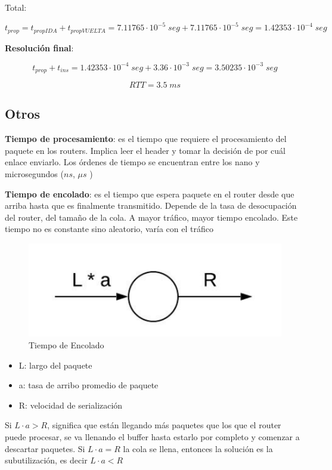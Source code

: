 \documentclass[titlepage,a4paper]{article}
\begin{document}
Total:

$$t_{prop} = t_{propIDA} + t_{propVUELTA}  =  7.11765 \cdot 10^{-5} \; seg + 7.11765 \cdot 10^{-5} \; seg = 1.42353\cdot10^{-4} \; seg$$

\textbf{Resolución final}:

$$ t_{prop} + t_{ins} = 1.42353\cdot10^{-4} \; seg + 3.36 \cdot 10^{-3} \; seg = 3.50235 \cdot 10^{-3} \; seg$$

$$ RTT = 3.5 \; ms$$


\subsection{Otros}

\textbf{Tiempo de procesamiento}: es el tiempo que requiere el procesamiento del paquete en los routers. Implica leer el header y tomar la decisión de por cuál enlace enviarlo. Los órdenes de tiempo se encuentran entre los nano y microsegundos ($ns$, $\mu s$ )

\textbf{Tiempo de encolado}: es el tiempo que espera paquete en el router desde que arriba hasta que es finalmente transmitido. Depende de la tasa de desocupación del router, del tamaño de la cola. A mayor tráfico, mayor tiempo encolado. Este tiempo no es constante sino aleatorio, varía con el tráfico

\begin{figure}[H]
\centering
\includegraphics[width=\textwidth]{imagenes/tiempoEncolado.png}
\caption{Tiempo de Encolado}
\end{figure}

\begin{itemize}
    \item L: largo del paquete
    \item a: tasa de arribo promedio de paquete
    \item R: velocidad de serialización
\end{itemize}

Si $L \cdot a > R$, significa que están llegando más paquetes que los que el router puede procesar, se va llenando el buffer hasta estarlo por completo y comenzar a descartar paquetes. Si $L \cdot a = R$ la cola se llena, entonces la solución es la subutilización, es decir $L \cdot a < R$
\end{document}
